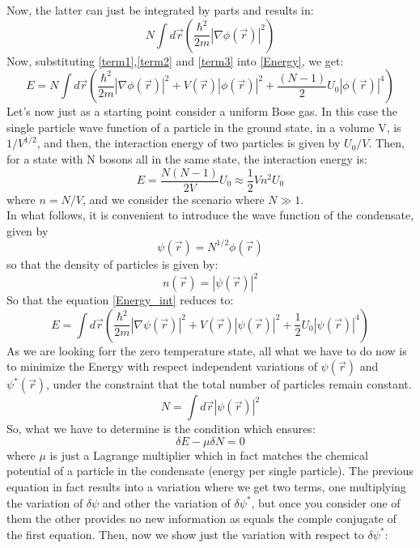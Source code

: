 \documentclass[a4paper,10pt]{article}
\begin{document}
Now, the latter can just be integrated by parts and results in:
\begin{equation}\label{term1}
 N\int d\vec{r} \left(\frac{\hbar^2}{2m}|\nabla\phi(\vec{r})|^2\right)
\end{equation}
Now, substituting \ref{term1},\ref{term2} and \ref{term3} into \ref{Energy}, we get:
\begin{equation}\label{Energy_int}
 E=N\int d\vec{r}\left(\frac{\hbar^2}{2m}|\nabla\phi(\vec{r})|^2+V(\vec{r})|\phi(\vec{r})|^2+\frac{(N-1)}{2}U_0|\phi(\vec{r})|^4\right)
\end{equation}
Let's now just as a starting point consider a uniform Bose gas. In this case the single particle wave function of a particle in the ground state, in a volume V, is $1/V^{1/2}$, and then, the interaction energy of two particles is given by $U_0/V$. Then, for a state with N bosons all in the same state, the interaction energy is:
\begin{equation}
 E=\frac{N(N-1)}{2V}U_0 \approx\frac{1}{2}V n^2 U_0
\end{equation}
where $n=N/V$, and we consider the scenario where $N\gg1$.\\
In what follows, it is convenient to introduce the wave function of the condensate, given by 
\begin{equation}
 \psi(\vec{r})=N^{1/2}\phi(\vec{r})
\end{equation}
so that the density of particles is given by:
\begin{equation}
 n(\vec{r})=|\psi(\vec{r})|^2
\end{equation}
So that the equation \ref{Energy_int} reduces to:
\begin{equation}\label{Energy_cond_wave_f}
 E=\int d\vec{r}\left(\frac{\hbar^2}{2m}|\nabla\psi(\vec{r})|^2+V(\vec{r})|\psi(\vec{r})|^2+\frac{1}{2}U_0|\psi(\vec{r})|^4\right)
\end{equation}
As we are looking forr the zero temperature state, all what we have to do now is to minimize the Energy with respect independent variations of $\psi(\vec{r})$ and $\psi^{*}(\vec{r})$, under the constraint that the total number of particles remain constant. 
\begin{equation}
 N=\int d\vec{r}|\psi(\vec{r})|^2
\end{equation}
So, what we have to determine is the condition which ensures:
\begin{equation}
 \delta E- \mu \delta N=0
\end{equation}
where $\mu$ is just a Lagrange multiplier which in fact matches the chemical potential of a particle in the condensate (energy per single particle). The previous equation in fact results into a variation where we get two terms, one multiplying the variation of $\delta \psi$ and other the variation of $\delta \psi^*$, but once you consider one of them the other provides no new information as equals the comple conjugate of the first equation. Then, now we show just the variation with respect to $\delta \psi^*$:
\end{document}
